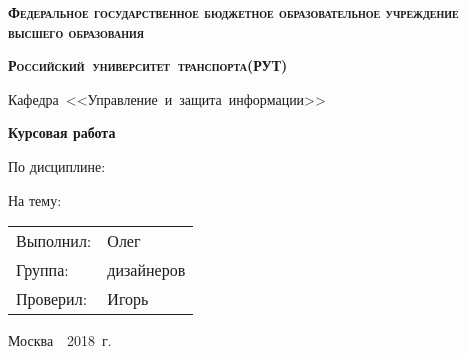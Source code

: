\documentclass[12pt,a4paper]{report}
\begin{document}
\begin{titlepage}
	\centering
	{\Large \bfseries \textsc{Федеральное государственное бюджетное образовательное учреждение высшего образования}\par}
	\vspace{0,5cm}
	{\large \bfseries \textsc{Российский~университет~транспорта(РУТ)}\par}
	\vspace{0.5cm}
	\hline
    \vspace{2cm}
	{\Large Кафедра~<<Управление~и~защита~информации>>\par}
	\vspace{2cm}
    {\Large \bfseries Курсовая работа\par}
    {\Large По дисциплине: \par}
    {\Large На тему: \par}
    \vfill
    \begin{flushright}
        \begin{tabular}{l l}
            {\Large Выполнил: } & {\Large Олег } \\
            {\Large Группа: } & {\Large дизайнеров}\\
            {\Large Проверил: } & {\Large Игорь }\\
        \end{tabular}
    \end{flushright}
    \vfill
	{\large Москва~~2018~г. \par}
\end{titlepage}
\end{document}
